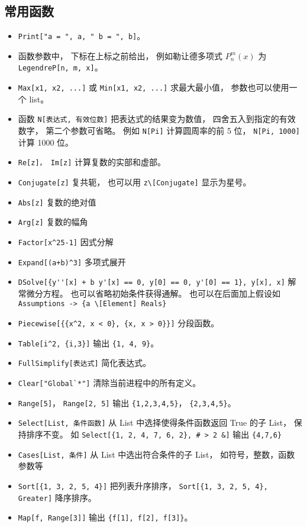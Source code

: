 \subsection{常用函数}
\begin{itemize}
\item \verb|Print["a = ", a, " b = ", b]|。
\item 函数参数中， 下标在上标之前给出， 例如勒让德多项式 $P_n^m(x)$ 为 \verb|LegendreP[n, m, x]|。
\item \verb|Max[x1, x2, ...]| 或 \verb|Min[x1, x2, ...]| 求最大最小值， 参数也可以使用一个 list。
\item 函数 \verb|N[表达式, 有效位数]| 把表达式的结果变为数值， 四舍五入到指定的有效数字， 第二个参数可省略。 例如 \verb|N[Pi]| 计算圆周率的前 5 位， \verb|N[Pi, 1000]| 计算 1000 位。
\item \verb|Re[z]， Im[z]| 计算复数的实部和虚部。
\item \verb|Conjugate[z]| 复共轭， 也可以用 \verb|z\[Conjugate]| 显示为星号。
\item \verb|Abs[z]| 复数的绝对值
\item \verb|Arg[z]| 复数的幅角
\item \verb|Factor[x^25-1]| 因式分解
\item \verb|Expand[(a+b)^3]| 多项式展开
\item \verb|DSolve[{y''[x] + b y'[x] == 0, y[0] == 0, y'[0] == 1}, y[x], x]| 解常微分方程。 也可以省略初始条件获得通解。 也可以在后面加上假设如 \verb|Assumptions -> {a \[Element] Reals}|
\item \verb|Piecewise[{{x^2, x < 0}, {x, x > 0}}]| 分段函数。
\item \verb|Table[i^2, {i,3}]| 输出 \verb|{1, 4, 9}|。
\item \verb|FullSimplify[表达式]| 简化表达式。
\item \verb|Clear["Global`*"]| 清除当前进程中的所有定义。
\item \verb|Range[5]|， \verb|Range[2, 5]| 输出 \verb|{1,2,3,4,5}|， \verb|{2,3,4,5}|。
\item \verb|Select[List, 条件函数]| 从 List 中选择使得条件函数返回 True 的子 List， 保持排序不变。 如 \verb|Select[{1, 2, 4, 7, 6, 2}, # > 2 &]| 输出 \verb|{4,7,6}|
\item \verb|Cases[List, 条件]| 从 List 中选出符合条件的子 List， 如符号，整数，函数参数等
\item \verb|Sort[{1, 3, 2, 5, 4}]| 把列表升序排序， \verb|Sort[{1, 3, 2, 5, 4}, Greater]| 降序排序。 
\item \verb|Map[f, Range[3]]| 输出 \verb|{f[1], f[2], f[3]}|。

\end{itemize}
